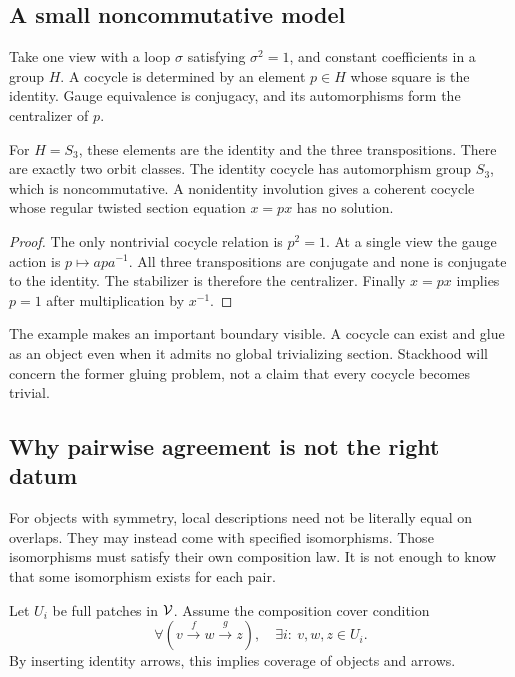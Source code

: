 \subsection{A small noncommutative model}
\begin{example}\label{KS33}
Take one view with a loop \(\sigma\) satisfying \(\sigma^2=1\), and constant coefficients in a group \(H\). A cocycle is determined by an element \(p\in H\) whose square is the identity. Gauge equivalence is conjugacy, and its automorphisms form the centralizer of \(p\).

For \(H=S_3\), these elements are the identity and the three transpositions. There are exactly two orbit classes. The identity cocycle has automorphism group \(S_3\), which is noncommutative. A nonidentity involution gives a coherent cocycle whose regular twisted section equation \(x=px\) has no solution.
\end{example}
\begin{proof}
The only nontrivial cocycle relation is \(p^2=1\). At a single view the gauge action is \(p\mapsto apa^{-1}\). All three transpositions are conjugate and none is conjugate to the identity. The stabilizer is therefore the centralizer. Finally \(x=px\) implies \(p=1\) after multiplication by \(x^{-1}\).
\end{proof}
The example makes an important boundary visible. A cocycle can exist and glue as an object even when it admits no global trivializing section. Stackhood will concern the former gluing problem, not a claim that every cocycle becomes trivial.


\label{sec:descent}
\subsection{Why pairwise agreement is not the right datum}
For objects with symmetry, local descriptions need not be literally equal on overlaps. They may instead come with specified isomorphisms. Those isomorphisms must satisfy their own composition law. It is not enough to know that some isomorphism exists for each pair.

Let \(U_i\) be full patches in \(\mathcal V\). Assume the composition cover condition
\begin{equation}\label{eq:compositioncover}
 \forall(v\xrightarrow f w\xrightarrow g z),\quad
 \exists i:\ v,w,z\in U_i.
\end{equation}
By inserting identity arrows, this implies coverage of objects and arrows.

